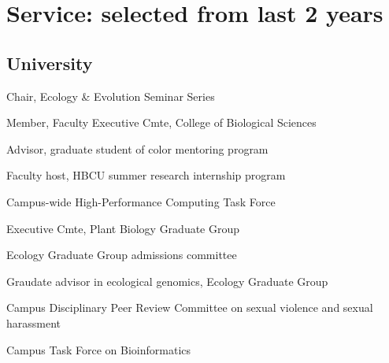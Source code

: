 \documentclass[letterpaper,10pt]{article}
\renewenvironment{itemize}{
  \begin{list}{}{
    \setlength{\leftmargin}{1.5em}
  }
}{
  \end{list}
}
\begin{document}
\section*{Service: selected from last 2 years}
\begin{itemize}
\setlength\itemsep{0ex}
\subsection*{University}
\item Chair, Ecology \& Evolution Seminar Series
\item Member, Faculty Executive Cmte, College of Biological Sciences
\item Advisor, graduate student of color mentoring program %
\item Faculty host, HBCU summer research internship program %
\item Campus-wide High-Performance Computing Task Force%
\item Executive Cmte, Plant Biology Graduate Group%
\item Ecology Graduate Group admissions committee%
\item Graudate advisor in ecological genomics, Ecology Graduate Group%
\item Campus Disciplinary Peer Review Committee on sexual violence and sexual harassment%
\item Campus Task Force on Bioinformatics%

\end{itemize}
\end{document}
